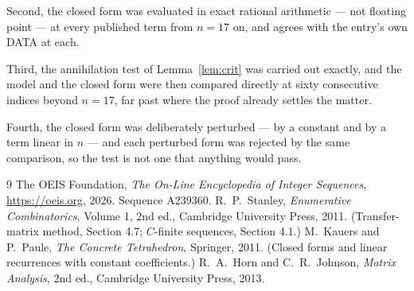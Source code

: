 \documentclass[11pt,a4paper]{article}
\theoremstyle{plain}
\theoremstyle{definition}
\begin{document}
Second, the closed form was evaluated in exact rational arithmetic --- not floating point ---
at every published term from $n=17$ on, and agrees with the entry's own DATA at each.

Third, the annihilation test of Lemma~\ref{lem:crit} was carried out exactly, and the model
and the closed form were then compared directly at sixty consecutive indices beyond
$n=17$, far past where the proof already settles the matter.

Fourth, the closed form was deliberately perturbed --- by a constant and by a term linear in
$n$ --- and each perturbed form was rejected by the same comparison, so the test is not one
that anything would pass.

\begin{thebibliography}{9}
 The OEIS Foundation, \emph{The On-Line Encyclopedia of Integer
Sequences}, \url{https://oeis.org}, 2026. Sequence A239360.
 R.~P.~Stanley, \emph{Enumerative Combinatorics}, Volume 1, 2nd ed.,
Cambridge University Press, 2011. (Transfer-matrix method, Section 4.7; $C$-finite sequences,
Section 4.1.)
 M.~Kauers and P.~Paule, \emph{The Concrete Tetrahedron}, Springer, 2011.
(Closed forms and linear recurrences with constant coefficients.)
 R.~A.~Horn and C.~R.~Johnson, \emph{Matrix Analysis}, 2nd ed., Cambridge
University Press, 2013.
\end{thebibliography}
\end{document}
